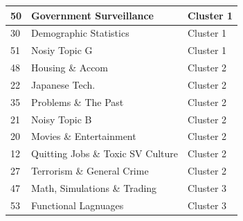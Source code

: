 \documentclass[11pt,journal,final,a4paper]{IEEEtran}
\begin{document}
\begin{table}[!ht]
\begin{tabular}{lll}
50                                                 & Government Surveillance                                                                                      & Cluster 1    \\ \hline
30                                                 & Demographic Statistics                                                                                       & Cluster 1    \\ \hline
51                                                 & Nosiy Topic G                                                                                                & Cluster 1    \\ \hline
48                                                 & Housing \& Accom                                                                                             & Cluster 2    \\ \hline
22                                                 & Japanese Tech.                                                                                               & Cluster 2    \\ \hline
35                                                 & Problems \& The Past & Cluster 2    \\ \hline
21                                                 & Noisy Topic B                                                                                                & Cluster 2    \\ \hline
20                                                 & Movies \& Entertainment                                                                                      & Cluster 2    \\ \hline
12                                                 & Quitting Jobs \& Toxic SV Culture                                                                            & Cluster 2    \\ \hline
27                                                 & Terrorism \& General Crime                                                                                   & Cluster 2    \\ \hline
47                                                 & Math, Simulations \& Trading                                                                                 & Cluster 3    \\ \hline
53                                                 & Functional Lagnuages                                                                                         & Cluster 3    \\ \hline

\end{tabular}
\end{table}
\end{document}
